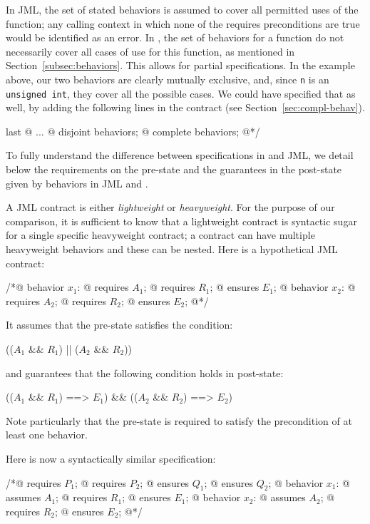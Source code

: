In JML, the set of stated behaviors is assumed to cover all
permitted uses of the function; any calling context in which none of the requires preconditions are true would be identified as an error.
In \acsl, the set of behaviors for a function do not
necessarily cover all cases of use for this function, as mentioned in
Section~\ref{subsec:behaviors}. This allows for partial
specifications. In the example above, our two behaviors are clearly mutually exclusive,
and, since \lstinline|n| is an \lstinline|unsigned int|, 
they cover all the possible cases. We could have specified that as well, by
adding the following lines in the contract (see
Section~\ref{sec:compl-behav}).
\begin{listing}{last}
  @ ...
  @ disjoint behaviors;
  @ complete behaviors;
  @*/
\end{listing}

To fully understand the difference between specifications in \acsl and
JML, we detail below the requirements on the pre-state and
the guarantees in the post-state given by behaviors in JML and \acsl.

A JML contract is either \emph{lightweight} or \emph{heavyweight}.
For the purpose of our comparison, it is sufficient to know that a
lightweight contract is syntactic sugar for a single specific 
heavyweight contract; a contract can have multiple heavyweight behaviors and these can be nested.
Here is a hypothetical JML contract:
\begin{listing}{1}
/*@ behavior $x_1$:
  @   requires $A_1$;
  @   requires $R_1$;
  @   ensures $E_1$;
  @ behavior $x_2$:
  @   requires $A_2$;
  @   requires $R_2$;
  @   ensures $E_2$;
  @*/
\end{listing}
It assumes that the pre-state satisfies the condition:
\begin{listing-nonumber}
(($A_1$ && $R_1$) || ($A_2$ && $R_2$))
\end{listing-nonumber}
and guarantees that the following condition holds in post-state:
\begin{listing-nonumber}
  (\old($A_1$ && $R_1$) ==> $E_1$) && (\old($A_2$ && $R_2$) ==> $E_2$)
\end{listing-nonumber}
Note particularly that the pre-state is required to satisfy
the precondition of at least one behavior.

Here is now a syntactically similar \acsl specification:

\begin{listing}{1}
/*@ requires $P_1$;
  @ requires $P_2$;
  @ ensures  $Q_1$;
  @ ensures  $Q_2$;
  @ behavior $x_1$:
  @   assumes $A_1$;
  @   requires $R_1$;
  @   ensures $E_1$;
  @ behavior $x_2$:
  @   assumes $A_2$;
  @   requires $R_2$;
  @   ensures $E_2$;
  @*/
\end{listing}

